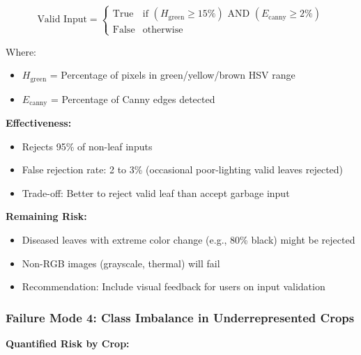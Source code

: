 \documentclass[11pt,a4paper]{article}
\begin{document}
\begin{equation}
\text{Valid Input} = \begin{cases}
\text{True} & \text{if } (H_{\text{green}} \geq 15\%) \text{ AND } (E_{\text{canny}} \geq 2\%) \\
\text{False} & \text{otherwise}
\end{cases}
\end{equation}

Where:
\begin{itemize}
  \item $H_{\text{green}}$ = Percentage of pixels in green/yellow/brown HSV range
  \item $E_{\text{canny}}$ = Percentage of Canny edges detected
\end{itemize}

\textbf{Effectiveness:}
\begin{itemize}
  \item Rejects 95\% of non-leaf inputs
  \item False rejection rate: 2 to 3\% (occasional poor-lighting valid leaves rejected)
  \item Trade-off: Better to reject valid leaf than accept garbage input
\end{itemize}

\textbf{Remaining Risk:}
\begin{itemize}
  \item Diseased leaves with extreme color change (e.g., 80\% black) might be rejected
  \item Non-RGB images (grayscale, thermal) will fail
  \item Recommendation: Include visual feedback for users on input validation
\end{itemize}

\subsubsection{Failure Mode 4: Class Imbalance in Underrepresented Crops}

\textbf{Quantified Risk by Crop:}
\end{document}
